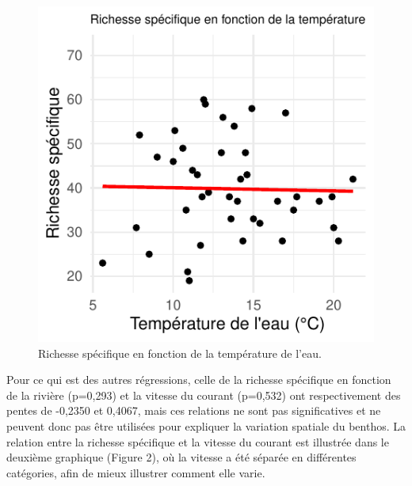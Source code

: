 \documentclass[9pt,twocolumn,twoside,final]{pnas-new}
\begin{document}
\begin{figure}

{\centering \includegraphics{RMarkdown-article_files/figure-latex/fig_temperature-1} 

}

\caption{Richesse spécifique en fonction de la température de l'eau.}\label{fig:fig_temperature}
\end{figure}

Pour ce qui est des autres régressions, celle de la richesse spécifique
en fonction de la rivière (p=0,293) et la vitesse du courant (p=0,532)
ont respectivement des pentes de -0,2350 et 0,4067, mais ces relations
ne sont pas significatives et ne peuvent donc pas être utilisées pour
expliquer la variation spatiale du benthos. La relation entre la
richesse spécifique et la vitesse du courant est illustrée dans le
deuxième graphique (Figure 2), où la vitesse a été séparée en
différentes catégories, afin de mieux illustrer comment elle varie.
\end{document}

